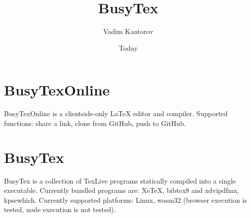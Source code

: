 \documentclass[11pt]{article}
\begin{document}
\title{BusyTex}
\author{Vadim Kantorov}
\date{Today}
\maketitle

\section{BusyTexOnline}
BusyTexOnline is a clientside-only LaTeX editor and compiler. Supported functions: share a link, clone from GitHub, push to GitHub. 

\section{BusyTex}
BusyTex is a collection of TexLive programs statically compiled into a single executable. Currently bundled programs are: XeTeX, bibtex8 and xdvipdfmx, kpsewhich. Currently supported platforms: Linux, wasm32 (browser execution is tested, node execution is not tested).
\end{document}
